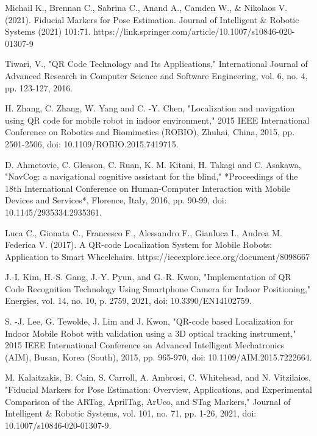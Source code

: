 
\newpage
{}
\renewcommand{\bibname}{References}

\begin{thebibliography}{9}
	Michail K., Brennan C., Sabrina C., Anand A., Camden W., \& Nikolaos
	V. (2021). Fiducial Markers for Pose Estimation. Journal of Intelligent \&
	Robotic Systems (2021) 101:71.
	https://link.springer.com/article/10.1007/s10846-020-01307-9
		
	 Tiwari, V., "QR Code Technology and Its Applications," International Journal of Advanced Research in Computer Science and Software Engineering, vol. 6, no. 4, pp. 123-127, 2016.
	
	H. Zhang, C. Zhang, W. Yang and C. -Y. Chen, "Localization and navigation using QR code for mobile robot in indoor environment," 2015 IEEE International Conference on Robotics and Biomimetics (ROBIO), Zhuhai, China, 2015, pp. 2501-2506, doi: 10.1109/ROBIO.2015.7419715.
	
	D. Ahmetovic, C. Gleason, C. Ruan, K. M. Kitani, H. Takagi and C. Asakawa, "NavCog: a navigational cognitive assistant for the blind," *Proceedings of the 18th International Conference on Human-Computer Interaction with Mobile Devices and Services*, Florence, Italy, 2016, pp. 90-99, doi: 10.1145/2935334.2935361.
	
	

	Luca C., Gionata C., Francesco F., Alessandro F., Gianluca I., Andrea M. Federica V. (2017). A QR-code Localization System for Mobile Robots: Application to Smart Wheelchairs.
	https://ieeexplore.ieee.org/document/8098667
	
	J.-I. Kim, H.-S. Gang, J.-Y. Pyun, and G.-R. Kwon, "Implementation of QR Code Recognition Technology Using Smartphone Camera for Indoor Positioning," Energies, vol. 14, no. 10, p. 2759, 2021, doi: 10.3390/EN14102759.
	
	S. -J. Lee, G. Tewolde, J. Lim and J. Kwon, "QR-code based Localization for Indoor Mobile Robot with validation using a 3D optical tracking instrument," 2015 IEEE International Conference on Advanced Intelligent Mechatronics (AIM), Busan, Korea (South), 2015, pp. 965-970, doi: 10.1109/AIM.2015.7222664.
	
	M. Kalaitzakis, B. Cain, S. Carroll, A. Ambrosi, C. Whitehead, and N. Vitzilaios, "Fiducial Markers for Pose Estimation: Overview, Applications, and Experimental Comparison of the ARTag, AprilTag, ArUco, and STag Markers," Journal of Intelligent \& Robotic Systems, vol. 101, no. 71, pp. 1-26, 2021, doi: 10.1007/s10846-020-01307-9.
	

\end{thebibliography}
